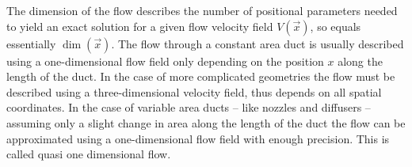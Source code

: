 	The dimension of the flow describes the number of positional parameters needed to yield an exact solution for a given flow velocity field $V(\vec{x})$, so equals essentially $\dim(\vec{x})$. 
	The flow through a constant area duct is usually described using a one-dimensional flow field only depending on the position $x$ along the length of the duct.
	In the case of more complicated geometries the flow must be described using a three-dimensional velocity field, thus depends on all spatial coordinates.
	In the case of variable area ducts -- like nozzles and diffusers -- assuming only a slight change in area along the length of the duct the flow can be approximated using a one-dimensional flow field with enough precision.
	This is called quasi one dimensional flow. \cite{anderson2021modern}
